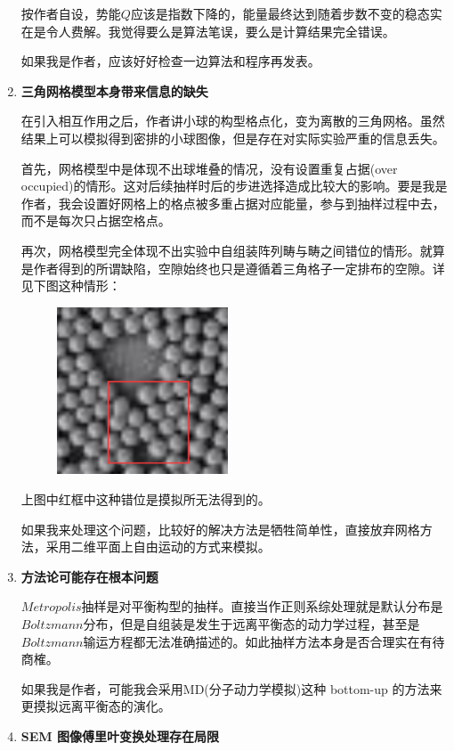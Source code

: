 \documentclass[UTF8]{ctexart}
\begin{document}
\begin{enumerate}
		按作者自设，势能$Q$应该是指数下降的，能量最终达到随着步数不变的稳态实在是令人费解。我觉得要么是算法笔误，要么是计算结果完全错误。
		
		如果我是作者，应该好好检查一边算法和程序再发表。
		
		\item \textbf{三角网格模型本身带来信息的缺失}
		
		在引入相互作用之后，作者讲小球的构型格点化，变为离散的三角网格。虽然结果上可以模拟得到密排的小球图像，但是存在对实际实验严重的信息丢失。
		
		首先，网格模型中是体现不出球堆叠的情况，没有设置重复占据(over occupied)的情形。这对后续抽样时后的步进选择造成比较大的影响。要是我是作者，我会设置好网格上的格点被多重占据对应能量，参与到抽样过程中去，而不是每次只占据空格点。
		
		再次，网格模型完全体现不出实验中自组装阵列畴与畴之间错位的情形。就算是作者得到的所谓缺陷，空隙始终也只是遵循着三角格子一定排布的空隙。详见下图这种情形：
		
		
		\begin{figure}[H]
			\centering  %
			\includegraphics[width=2in]{1}
		\end{figure}		
		
		上图中红框中这种错位是摸拟所无法得到的。
		
		如果我来处理这个问题，比较好的解决方法是牺牲简单性，直接放弃网格方法，采用二维平面上自由运动的方式来模拟。
		
	
	\item \textbf{方法论可能存在根本问题}
	
	$Metropolis$抽样是对平衡构型的抽样。直接当作正则系综处理就是默认分布是$Boltzmann$分布，但是自组装是发生于远离平衡态的动力学过程，甚至是$Boltzmann$输运方程都无法准确描述的。如此抽样方法本身是否合理实在有待商榷。
	
	如果我是作者，可能我会采用MD(分子动力学模拟)这种 bottom-up 的方法来更摸拟远离平衡态的演化。
	
	\item \textbf{SEM 图像傅里叶变换处理存在局限}
	

\end{enumerate}
\end{document}

